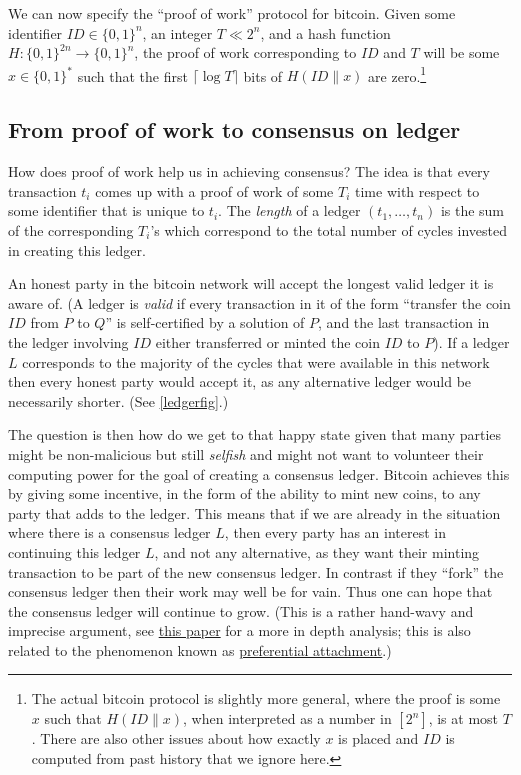 We can now specify the ``proof of work'' protocol for bitcoin. Given
some identifier \(\ensuremath{\mathit{ID}}\in\{0,1\}^n\), an integer
\(T \ll 2^n\), and a hash function
\(H:\{0,1\}^{2n}\rightarrow\{0,1\}^n\), the proof of work corresponding
to \(\ensuremath{\mathit{ID}}\) and \(T\) will be some \(x\in\{0,1\}^*\)
such that the first \(\lceil \log T \rceil\) bits of
\(H(\ensuremath{\mathit{ID}}\| x)\) are zero.\footnote{The actual
  bitcoin protocol is slightly more general, where the proof is some
  \(x\) such that \(H(\ensuremath{\mathit{ID}}\|x)\), when interpreted
  as a number in \([2^n]\), is at most \(T\). There are also other
  issues about how exactly \(x\) is placed and
  \(\ensuremath{\mathit{ID}}\) is computed from past history that we
  ignore here.}

\subsection{From proof of work to consensus on
ledger}\label{From-proof-of-work-to-con}

How does proof of work help us in achieving consensus? The idea is that
every transaction \(t_i\) comes up with a proof of work of some \(T_i\)
time with respect to some identifier that is unique to \(t_i\). The
\emph{length} of a ledger \((t_1,\ldots,t_n)\) is the sum of the
corresponding \(T_i\)'s which correspond to the total number of cycles
invested in creating this ledger.

An honest party in the bitcoin network will accept the longest valid
ledger it is aware of. (A ledger is \emph{valid} if every transaction in
it of the form ``transfer the coin \(\ensuremath{\mathit{ID}}\) from
\(P\) to \(Q\)'' is self-certified by a solution of \(P\), and the last
transaction in the ledger involving \(\ensuremath{\mathit{ID}}\) either
transferred or minted the coin \(\ensuremath{\mathit{ID}}\) to \(P\)).
If a ledger \(L\) corresponds to the majority of the cycles that were
available in this network then every honest party would accept it, as
any alternative ledger would be necessarily shorter. (See
\cref{ledgerfig}.)

The question is then how do we get to that happy state given that many
parties might be non-malicious but still \emph{selfish} and might not
want to volunteer their computing power for the goal of creating a
consensus ledger. Bitcoin achieves this by giving some incentive, in the
form of the ability to mint new coins, to any party that adds to the
ledger. This means that if we are already in the situation where there
is a consensus ledger \(L\), then every party has an interest in
continuing this ledger \(L\), and not any alternative, as they want
their minting transaction to be part of the new consensus ledger. In
contrast if they ``fork'' the consensus ledger then their work may well
be for vain. Thus one can hope that the consensus ledger will continue
to grow. (This is a rather hand-wavy and imprecise argument, see
\href{https://eprint.iacr.org/2015/261}{this paper} for a more in depth
analysis; this is also related to the phenomenon known as
\href{https://en.wikipedia.org/wiki/Preferential_attachment}{preferential
attachment}.)

